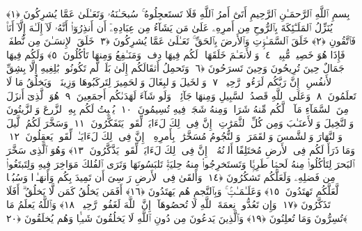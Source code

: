 
  
    
  
    
    

\nopagebreak
  بِسمِ ٱللَّهِ ٱلرَّحمَـٰنِ ٱلرَّحِيمِ
  أَتَىٰٓ أَمرُ ٱللَّهِ فَلَا تَستَعجِلُوهُ ۚ سُبحَـٰنَهُۥ وَتَعَـٰلَىٰ عَمَّا يُشرِكُونَ ﴿١﴾
 يُنَزِّلُ ٱلمَلَـٰٓئِكَةَ بِٱلرُّوحِ مِن أَمرِهِۦ عَلَىٰ مَن يَشَآءُ مِن عِبَادِهِۦٓ أَن أَنذِرُوٓا۟ أَنَّهُۥ لَآ إِلَـٰهَ إِلَّآ أَنَا۠ فَٱتَّقُونِ ﴿٢﴾
 خَلَقَ ٱلسَّمَـٰوَٟتِ وَٱلأَرضَ بِٱلحَقِّ ۚ تَعَـٰلَىٰ عَمَّا يُشرِكُونَ ﴿٣﴾
 خَلَقَ ٱلإِنسَـٰنَ مِن نُّطفَةٍۢ فَإِذَا هُوَ خَصِيمٌۭ مُّبِينٌۭ ﴿٤﴾
 وَٱلأَنعَـٰمَ خَلَقَهَا ۗ لَكُم فِيهَا دِفءٌۭ وَمَنَـٰفِعُ وَمِنهَا تَأكُلُونَ ﴿٥﴾
 وَلَكُم فِيهَا جَمَالٌ حِينَ تُرِيحُونَ وَحِينَ تَسرَحُونَ ﴿٦﴾
 وَتَحمِلُ أَثقَالَكُم إِلَىٰ بَلَدٍۢ لَّم تَكُونُوا۟ بَٰلِغِيهِ إِلَّا بِشِقِّ ٱلأَنفُسِ ۚ إِنَّ رَبَّكُم لَرَءُوفٌۭ رَّحِيمٌۭ ﴿٧﴾
 وَٱلخَيلَ وَٱلبِغَالَ وَٱلحَمِيرَ لِتَركَبُوهَا وَزِينَةًۭ ۚ وَيَخلُقُ مَا لَا تَعلَمُونَ ﴿٨﴾
 وَعَلَى ٱللَّهِ قَصدُ ٱلسَّبِيلِ وَمِنهَا جَآئِرٌۭ ۚ وَلَو شَآءَ لَهَدَىٰكُم أَجمَعِينَ ﴿٩﴾
 هُوَ ٱلَّذِىٓ أَنزَلَ مِنَ ٱلسَّمَآءِ مَآءًۭ ۖ لَّكُم مِّنهُ شَرَابٌۭ وَمِنهُ شَجَرٌۭ فِيهِ تُسِيمُونَ ﴿١٠﴾
 يُنۢبِتُ لَكُم بِهِ ٱلزَّرعَ وَٱلزَّيتُونَ وَٱلنَّخِيلَ وَٱلأَعنَـٰبَ وَمِن كُلِّ ٱلثَّمَرَٰتِ ۗ إِنَّ فِى ذَٟلِكَ لَءَايَةًۭ لِّقَومٍۢ يَتَفَكَّرُونَ ﴿١١﴾
 وَسَخَّرَ لَكُمُ ٱلَّيلَ وَٱلنَّهَارَ وَٱلشَّمسَ وَٱلقَمَرَ ۖ وَٱلنُّجُومُ مُسَخَّرَٰتٌۢ بِأَمرِهِۦٓ ۗ إِنَّ فِى ذَٟلِكَ لَءَايَـٰتٍۢ لِّقَومٍۢ يَعقِلُونَ ﴿١٢﴾
 وَمَا ذَرَأَ لَكُم فِى ٱلأَرضِ مُختَلِفًا أَلوَٟنُهُۥٓ ۗ إِنَّ فِى ذَٟلِكَ لَءَايَةًۭ لِّقَومٍۢ يَذَّكَّرُونَ ﴿١٣﴾
 وَهُوَ ٱلَّذِى سَخَّرَ ٱلبَحرَ لِتَأكُلُوا۟ مِنهُ لَحمًۭا طَرِيًّۭا وَتَستَخرِجُوا۟ مِنهُ حِليَةًۭ تَلبَسُونَهَا وَتَرَى ٱلفُلكَ مَوَاخِرَ فِيهِ وَلِتَبتَغُوا۟ مِن فَضلِهِۦ وَلَعَلَّكُم تَشكُرُونَ ﴿١٤﴾
 وَأَلقَىٰ فِى ٱلأَرضِ رَوَٟسِىَ أَن تَمِيدَ بِكُم وَأَنهَـٰرًۭا وَسُبُلًۭا لَّعَلَّكُم تَهتَدُونَ ﴿١٥﴾
 وَعَلَـٰمَـٰتٍۢ ۚ وَبِٱلنَّجمِ هُم يَهتَدُونَ ﴿١٦﴾
 أَفَمَن يَخلُقُ كَمَن لَّا يَخلُقُ ۗ أَفَلَا تَذَكَّرُونَ ﴿١٧﴾
 وَإِن تَعُدُّوا۟ نِعمَةَ ٱللَّهِ لَا تُحصُوهَآ ۗ إِنَّ ٱللَّهَ لَغَفُورٌۭ رَّحِيمٌۭ ﴿١٨﴾
 وَٱللَّهُ يَعلَمُ مَا تُسِرُّونَ وَمَا تُعلِنُونَ ﴿١٩﴾
 وَٱلَّذِينَ يَدعُونَ مِن دُونِ ٱللَّهِ لَا يَخلُقُونَ شَيـًۭٔا وَهُم يُخلَقُونَ ﴿٢٠﴾
